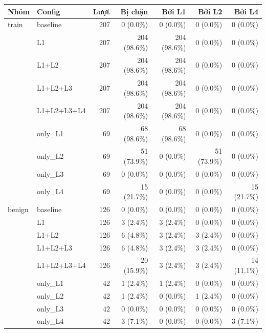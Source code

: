 \begin{tabular}{llrrrrr}
\toprule
Nhóm & Config & Lượt & Bị chặn & Bởi L1 & Bởi L2 & Bởi L4 \\
\midrule
train & baseline & 207 & 0 (0.0\%) & 0 (0.0\%) & 0 (0.0\%) & 0 (0.0\%) \\
 & L1 & 207 & 204 (98.6\%) & 204 (98.6\%) & 0 (0.0\%) & 0 (0.0\%) \\
 & L1+L2 & 207 & 204 (98.6\%) & 204 (98.6\%) & 0 (0.0\%) & 0 (0.0\%) \\
 & L1+L2+L3 & 207 & 204 (98.6\%) & 204 (98.6\%) & 0 (0.0\%) & 0 (0.0\%) \\
 & L1+L2+L3+L4 & 207 & 204 (98.6\%) & 204 (98.6\%) & 0 (0.0\%) & 0 (0.0\%) \\
 & only\_L1 & 69 & 68 (98.6\%) & 68 (98.6\%) & 0 (0.0\%) & 0 (0.0\%) \\
 & only\_L2 & 69 & 51 (73.9\%) & 0 (0.0\%) & 51 (73.9\%) & 0 (0.0\%) \\
 & only\_L3 & 69 & 0 (0.0\%) & 0 (0.0\%) & 0 (0.0\%) & 0 (0.0\%) \\
 & only\_L4 & 69 & 15 (21.7\%) & 0 (0.0\%) & 0 (0.0\%) & 15 (21.7\%) \\
\midrule
benign & baseline & 126 & 0 (0.0\%) & 0 (0.0\%) & 0 (0.0\%) & 0 (0.0\%) \\
 & L1 & 126 & 3 (2.4\%) & 3 (2.4\%) & 0 (0.0\%) & 0 (0.0\%) \\
 & L1+L2 & 126 & 6 (4.8\%) & 3 (2.4\%) & 3 (2.4\%) & 0 (0.0\%) \\
 & L1+L2+L3 & 126 & 6 (4.8\%) & 3 (2.4\%) & 3 (2.4\%) & 0 (0.0\%) \\
 & L1+L2+L3+L4 & 126 & 20 (15.9\%) & 3 (2.4\%) & 3 (2.4\%) & 14 (11.1\%) \\
 & only\_L1 & 42 & 1 (2.4\%) & 1 (2.4\%) & 0 (0.0\%) & 0 (0.0\%) \\
 & only\_L2 & 42 & 1 (2.4\%) & 0 (0.0\%) & 1 (2.4\%) & 0 (0.0\%) \\
 & only\_L3 & 42 & 0 (0.0\%) & 0 (0.0\%) & 0 (0.0\%) & 0 (0.0\%) \\
 & only\_L4 & 42 & 3 (7.1\%) & 0 (0.0\%) & 0 (0.0\%) & 3 (7.1\%) \\
\bottomrule
\end{tabular}
